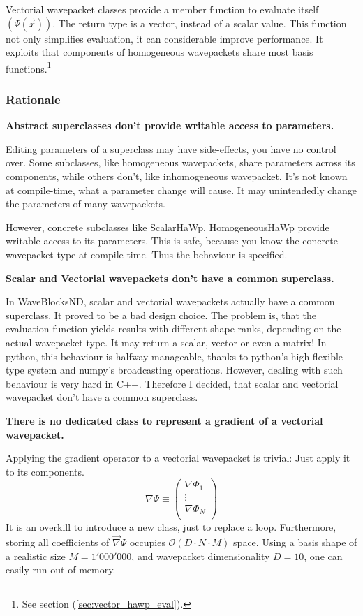 \documentclass{article}
\begin{document}
Vectorial wavepacket classes provide a member function to evaluate itself \((\Psi(\vec{x}))\).
The return type is a vector, instead of a scalar value.
This function not only simplifies evaluation, it can considerable improve performance.
It exploits that components of homogeneous wavepackets share most basis
functions.\footnote{See section (\ref{sec:vector_hawp_eval}).}

\subsubsection{Rationale}

\textbf{Abstract superclasses don't provide writable access to parameters.}\par
Editing parameters of a superclass may have side-effects, you have no control over.
Some subclasses, like homogeneous wavepackets, share parameters across its components, while
others don't, like inhomogeneous wavepacket. It's not known at compile-time, what a
parameter change will cause. It may unintendedly change the parameters of many wavepackets.

However, concrete subclasses like ScalarHaWp, HomogeneousHaWp provide writable
access to its parameters. This is safe, because you know the concrete wavepacket type at compile-time.
Thus the behaviour is specified.
\par\bigskip
\textbf{Scalar and Vectorial wavepackets don't have a common superclass.}\par
In WaveBlocksND, scalar and vectorial wavepackets actually have a common superclass.
It proved to be a bad design choice.
The problem is, that the evaluation function yields results
with different shape ranks, depending on the actual wavepacket type. It may
return a scalar, vector or even a matrix!
In python, this behaviour is halfway manageable, thanks to python's high flexible type system
and numpy's broadcasting operations.
However, dealing with such behaviour is very hard in C++.
Therefore I decided, that scalar and vectorial wavepacket don't have a common superclass.
\par\bigskip
\textbf{There is no dedicated class to represent a gradient of a vectorial wavepacket.}\par
Applying the gradient operator to a vectorial wavepacket is trivial: Just apply it
to its components.
\[\nabla \Psi \equiv
\begin{pmatrix}
  \nabla \Phi_1 \\
  \vdots \\
  \nabla \Phi_N \\
\end{pmatrix}
\]
It is an overkill to introduce a new class, just to replace a loop.
Furthermore, storing all coefficients of \(\vec{\nabla}\Psi\) occupies \(\mathcal{O}(D \cdot N \cdot M)\) space.
Using a basis shape of a realistic size \(M=1'000'000\), and wavepacket
dimensionality \(D=10\), one can easily run out of memory.
\end{document}
